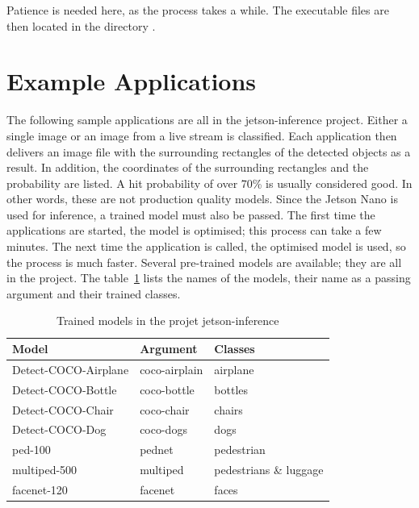 \medskip






\medskip


Patience is needed here, as the process takes a while. The executable files are then located in the directory .




\section{Example Applications}

The following sample applications are all in the jetson-inference project. Either a single image or an image from a live stream is classified. Each application then delivers an image file with the surrounding rectangles of the detected objects as a result. In addition, the coordinates of the surrounding rectangles and the probability are listed. A hit probability of over 70\% is usually considered good. In other words, these are not production quality models. Since the Jetson Nano is used for inference, a trained model must also be passed. The first time the applications are started, the model is optimised; this process can take a few minutes. The next time the application is called, the optimised model is used, so the process is much faster.  Several pre-trained models are available; they are all in the project. The table~\ref{HelloWorld:Nets} lists the names of the models, their name as a passing argument and their trained classes. 



\begin{table}
    \centering 
    \begin{tabular}{l|l|l}
      Model                & Argument      & Classes \\ \hline
      Detect-COCO-Airplane & coco-airplain & airplane\\
      Detect-COCO-Bottle   & coco-bottle   & bottles\\
      Detect-COCO-Chair    & coco-chair    & chairs\\
      Detect-COCO-Dog      & coco-dogs     & dogs\\
      ped-100              & pednet        & pedestrian \\
      multiped-500         & multiped      & pedestrians \& luggage \\
      facenet-120          & facenet       & faces
    \end{tabular}

   \caption{Trained models in the projet jetson-inference}\label{HelloWorld:Nets}



\end{table}


